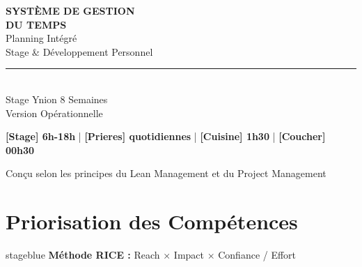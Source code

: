 \documentclass[12pt,a4paper]{article}
\newcommand{\priere}[1]{\textcolor{praypurple}{\textbf{#1}}}
\newcommand{\repos}[1]{\textcolor{restgray}{\textbf{#1}}}
\begin{document}
\begin{titlepage}
    \centering
    \vspace*{2cm}
    
    {\Huge \textbf{SYSTÈME DE GESTION}}\\[0.3cm]
    {\Huge \textbf{DU TEMPS}}\\[0.8cm]
    
    {\Large Planning Intégré}\\[0.3cm]
    {\Large Stage \& Développement Personnel}\\[1cm]
    
    \rule{0.6\textwidth}{0.5pt}\\[0.5cm]
    
    {\large Stage Ynion \textbar{} 8 Semaines}\\[0.3cm]
    {\large Version Opérationnelle}\\[1cm]
    
    \begin{minipage}{0.8\textwidth}
        \centering
        \repos{[Stage] 6h-18h} \quad | \quad
        \priere{[Prieres] quotidiennes} \quad | \quad
        \repos{[Cuisine] 1h30} \quad | \quad
        \repos{[Coucher] 00h30}
    \end{minipage}
    
    \vfill
    
    {\small Conçu selon les principes du Lean Management et du Project Management}
\end{titlepage}

\newpage
\tableofcontents
\newpage

\section{Priorisation des Compétences}

\begin{infobox}{stageblue}
\textbf{Méthode RICE :} Reach × Impact × Confiance / Effort
\end{infobox}

\vspace{0.5cm}
\end{document}
